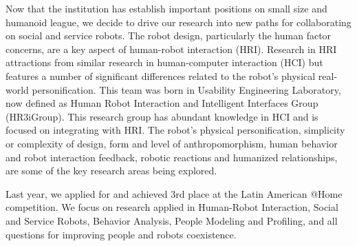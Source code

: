 Now that the institution has establish important positions on small size and humanoid league, we decide to drive our research into new paths for collaborating on social and service robots. The robot design, particularly the human factor concerns, are a key aspect of human-robot interaction (HRI). Research in HRI attractions from similar research in human-computer interaction (HCI) but features a number of significant differences related to the robot’s physical real-world personification. This team was born in Usability Engineering Laboratory, now defined as Human Robot Interaction and Intelligent Interfaces Group (HR3iGroup). This research group has abundant knowledge in HCI and is focused on integrating with HRI. The robot’s physical personification, simplicity or complexity of design, form and level of anthropomorphism, human behavior and robot interaction feedback, robotic reactions and humanized relationships, are some of the key research areas being explored.

Last year, we applied for and achieved 3rd place at the Latin American @Home competition. We focus on research applied in Human-Robot Interaction, Social and Service Robots, Behavior Analysis, People Modeling and Profiling, and all questions for improving people and robots coexistence.
